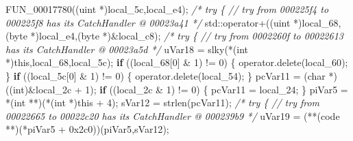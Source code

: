 \documentclass[
]{article}
\newenvironment{Shaded}{}{}
\newcommand{\BaseNTok}[1]{\textcolor[rgb]{0.25,0.63,0.44}{#1}}
\newcommand{\CommentTok}[1]{\textcolor[rgb]{0.38,0.63,0.69}{\textit{#1}}}
\newcommand{\ControlFlowTok}[1]{\textcolor[rgb]{0.00,0.44,0.13}{\textbf{#1}}}
\newcommand{\DataTypeTok}[1]{\textcolor[rgb]{0.56,0.13,0.00}{#1}}
\newcommand{\DecValTok}[1]{\textcolor[rgb]{0.25,0.63,0.44}{#1}}
\newcommand{\NormalTok}[1]{#1}
\newcommand{\OperatorTok}[1]{\textcolor[rgb]{0.40,0.40,0.40}{#1}}
\begin{document}
\begin{Shaded}
\begin{Highlighting}[]
\NormalTok{      FUN\_00017780}\OperatorTok{((}\NormalTok{uint }\OperatorTok{*)}\NormalTok{local\_5c}\OperatorTok{,}\NormalTok{local\_e4}\OperatorTok{);}
                    \CommentTok{/* try \{ // try from 000225f4 to 000225f8 has its CatchHandler @ 00023a41 */}
\NormalTok{      std}\OperatorTok{::}\NormalTok{operator}\OperatorTok{+((}\NormalTok{uint }\OperatorTok{*)}\NormalTok{local\_68}\OperatorTok{,(}\NormalTok{byte }\OperatorTok{*)}\NormalTok{local\_e4}\OperatorTok{,(}\NormalTok{byte }\OperatorTok{*)\&}\NormalTok{local\_c8}\OperatorTok{);}
                    \CommentTok{/* try \{ // try from 0002260f to 00022613 has its CatchHandler @ 00023a5d */}
\NormalTok{      uVar18 }\OperatorTok{=}\NormalTok{ slky}\OperatorTok{(*(}\DataTypeTok{int} \OperatorTok{*)}\NormalTok{this}\OperatorTok{,}\NormalTok{local\_68}\OperatorTok{,}\NormalTok{local\_5c}\OperatorTok{);}
      \ControlFlowTok{if} \OperatorTok{((}\NormalTok{local\_68}\OperatorTok{[}\DecValTok{0}\OperatorTok{]} \OperatorTok{\&} \DecValTok{1}\OperatorTok{)} \OperatorTok{!=} \DecValTok{0}\OperatorTok{)} \OperatorTok{\{}
\NormalTok{        operator}\OperatorTok{.}\NormalTok{delete}\OperatorTok{(}\NormalTok{local\_60}\OperatorTok{);}
      \OperatorTok{\}}
      \ControlFlowTok{if} \OperatorTok{((}\NormalTok{local\_5c}\OperatorTok{[}\DecValTok{0}\OperatorTok{]} \OperatorTok{\&} \DecValTok{1}\OperatorTok{)} \OperatorTok{!=} \DecValTok{0}\OperatorTok{)} \OperatorTok{\{}
\NormalTok{        operator}\OperatorTok{.}\NormalTok{delete}\OperatorTok{(}\NormalTok{local\_54}\OperatorTok{);}
      \OperatorTok{\}}
\NormalTok{      pcVar11 }\OperatorTok{=} \OperatorTok{(}\DataTypeTok{char} \OperatorTok{*)((}\DataTypeTok{int}\OperatorTok{)\&}\NormalTok{local\_2c }\OperatorTok{+} \DecValTok{1}\OperatorTok{);}
      \ControlFlowTok{if} \OperatorTok{((}\NormalTok{local\_2c }\OperatorTok{\&} \DecValTok{1}\OperatorTok{)} \OperatorTok{!=} \DecValTok{0}\OperatorTok{)} \OperatorTok{\{}
\NormalTok{        pcVar11 }\OperatorTok{=}\NormalTok{ local\_24}\OperatorTok{;}
      \OperatorTok{\}}
\NormalTok{      piVar5 }\OperatorTok{=} \OperatorTok{*(}\DataTypeTok{int} \OperatorTok{**)(*(}\DataTypeTok{int} \OperatorTok{*)}\NormalTok{this }\OperatorTok{+} \DecValTok{4}\OperatorTok{);}
\NormalTok{      sVar12 }\OperatorTok{=}\NormalTok{ strlen}\OperatorTok{(}\NormalTok{pcVar11}\OperatorTok{);}
                    \CommentTok{/* try \{ // try from 00022665 to 00022c20 has its CatchHandler @ 000239b9 */}
\NormalTok{      uVar19 }\OperatorTok{=} \OperatorTok{(**(}\NormalTok{code }\OperatorTok{**)(*}\NormalTok{piVar5 }\OperatorTok{+} \BaseNTok{0x2c0}\OperatorTok{))(}\NormalTok{piVar5}\OperatorTok{,}\NormalTok{sVar12}\OperatorTok{);}

\end{Highlighting}
\end{Shaded}
\end{document}

